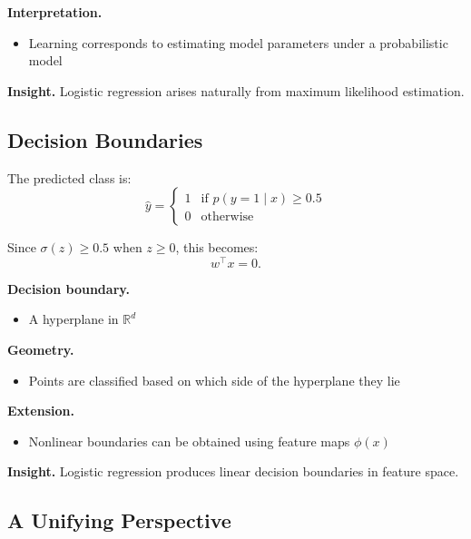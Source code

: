 \medskip

\noindent
\textbf{Interpretation.}
\begin{itemize}
    \item Learning corresponds to estimating model parameters under a probabilistic model
\end{itemize}

\medskip

\noindent
\textbf{Insight.}  
Logistic regression arises naturally from maximum likelihood estimation.

\subsection{Decision Boundaries}

The predicted class is:
\[
\hat{y} =
\begin{cases}
1 & \text{if } p(y=1 \mid x) \geq 0.5 \\
0 & \text{otherwise}
\end{cases}
\]

\medskip

\noindent
Since $\sigma(z) \geq 0.5$ when $z \geq 0$, this becomes:
\[
w^\top x = 0.
\]

\medskip

\noindent
\textbf{Decision boundary.}
\begin{itemize}
    \item A hyperplane in $\mathbb{R}^d$
\end{itemize}

\medskip

\noindent
\textbf{Geometry.}
\begin{itemize}
    \item Points are classified based on which side of the hyperplane they lie
\end{itemize}

\medskip

\noindent
\textbf{Extension.}
\begin{itemize}
    \item Nonlinear boundaries can be obtained using feature maps $\phi(x)$
\end{itemize}

\medskip

\noindent
\textbf{Insight.}  
Logistic regression produces linear decision boundaries in feature space.

\subsection{A Unifying Perspective}

